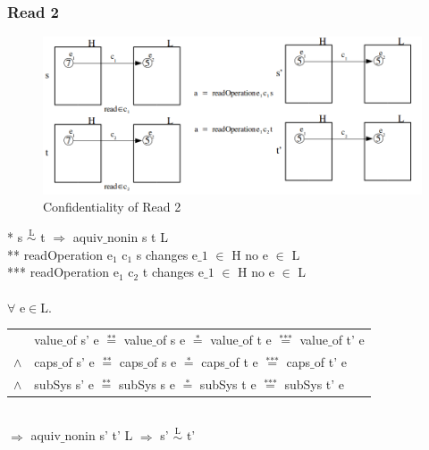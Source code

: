 \documentclass[pdftex,11pt,a4paper]{article}
\begin{document}
\subsubsection{Read 2}\label{sec:Read 2}
\begin{figure}[H]
		\includegraphics[width=1.1\textwidth]{./Pictures/read2Confidentality.png}
		\caption[Confidentiality of Read 2]{Confidentiality of Read 2}
	\label{fig:read2}
\end{figure}	
* s $\overset{\text{L}}{\sim}$ t $\Rightarrow$ aquiv$\_$nonin s t L	\\ 
** readOperation e$_1$ c$_1$ s changes e$\_1$ $\in$ H no e $\in$ L \\ 
*** readOperation e$_1$ c$_2$ t changes e$\_1$ $\in$ H no e $\in$ L \\ \\
$\forall$ e$\in$L. \\
\begin{tabular}{ll}
& value$\_$of s' e $\overset{\text{**}}{=}$ value$\_$of s e $\overset{\text{*}}{=}$ value$\_$of t e $\overset{\text{***}}{=}$ value$\_$of t' e \\
$\wedge$ & caps$\_$of s' e $\overset{\text{**}}{=}$ caps$\_$of s e $\overset{\text{*}}{=}$ caps$\_$of t e $\overset{\text{***}}{=}$ caps$\_$of t' e \\
$\wedge$ & subSys s' e $\overset{\text{**}}{=}$ subSys s e $\overset{\text{*}}{=}$ subSys t e $\overset{\text{***}}{=}$ subSys t' e
\end{tabular} \\
$\Rightarrow$ aquiv$\_$nonin s' t' L $\Rightarrow$ s' $\overset{\text{L}}{\sim}$ t' 
	\cleardoublepage
\end{document}
